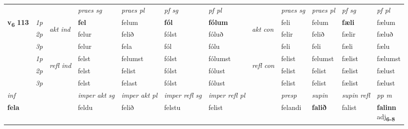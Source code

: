 \begin{longtable}[l]{X>{\footnotesize\itshape}llXXXXlXXXX}
 & &   & \textit{praes sg}  & \textit{praes pl}    & \textit{ pf sg} & \textit{pf pl} & & \textit{praes sg}  & \textit{praes pl}    & \textit{pf sg} & \textit{pf pl }  \\ \cmidrule{4-7} \cmidrule{9-12}
 \multirow{2}{*}{{{\textbf{v{\textsubscript{6}}} \Large{\textbf{113}}}}}  & 1p & \multirow{3}{*}{\begin{turn}{90}\textit{akt ind}\end{turn}} & \textbf{fel} & felum & \textbf{fól} & \textbf{fólum} & \multirow{3}{*}{\begin{turn}{90}\textit{akt con}\end{turn}} &feli & felum & \textbf{fæli} & fælum\\*
 & 2p &  &  felur  & felið & fólst & fóluð & & felir & felið & fælir & fæluð \\*
 & 3p &  & felur & fela & fól & fólu & & feli & feli& fæli & fælu \\*
\cmidrule{4-7} \cmidrule{9-12}
 & 1p & \multirow{3}{*}{\begin{turn}{90}\textit{refl ind}\end{turn}}  & felst & felumst & fólst & fólumst & \multirow{3}{*}{\begin{turn}{90}\textit{refl con}\end{turn}}  &felist & felumst & fælist & fælumst \\*
 & 2p &  & felst & felist & fólst & fólust & &felist & felist & fælist & fælust \\*
 & 3p  & & felst & felast & fólst & fólust & & felist & felist& fælist & fælust \\*
\cmidrule{4-7} \cmidrule{9-12}

   {\textit{inf}} & &  & \textit{imper akt sg} & \textit{imper akt pl} & \textit{imper refl sg} & \textit{imper refl pl} && \textit{presp} & \textit{supin} & \textit{supin refl} & \textit{pp m} \\*
  {\textbf{fela}} & && feldu  & felið & felstu & felist && felandi &  \textbf{falið} & falist & \specialcell{\textbf{falinn} \\ adj\textbf{\textsubscript{6-8}}} \\*

\midrule


\end{longtable}
